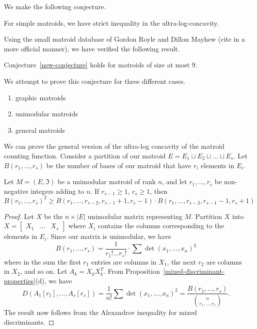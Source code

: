 \documentclass[12pt]{article}
\begin{document}
We make the following conjecture. 

\begin{conj} \label{new-conjecture}
	For simple matroids, we have strict inequality in the ultra-log-concavity. 
\end{conj}

Using the small matroid database of Gordon Royle and Dillon Mayhew (cite in a more official manner), we have verified the following result. 

\begin{thm}
	Conjecture~\ref{new-conjecture} holds for matroids of size at most $9$. 
\end{thm}

We attempt to prove this conjecture for three different cases. 
\begin{enumerate}[label = (\roman*)]
	\item graphic matroids
	\item unimodular matroids
	\item general matroids 
\end{enumerate}

We can prove the general version of the ultra-log concavity of the matroid counting function. Consider a partition of our matroid $E = E_1 \sqcup E_2 \sqcup \ldots \sqcup E_s$. Let $B(r_1, \ldots, r_s)$ be the number of bases of our matroid that have $r_i$ elements in $E_i$. 

\begin{thm}
	Let $M = (E, \mathfrak{I})$ be a unimodular matroid of rank $n$, and let $r_1, \ldots, r_s$ be non-negative integers adding to $n$. If $r_{s-1} \geq 1$, $r_s \geq 1$, then 
	\[
		B(r_1, \ldots, r_s)^2 \geq B(r_1, \ldots, r_{s-2}, r_{s-1} + 1, r_s - 1) \cdot B(r_1, \ldots, r_{s-2}, r_{s-1} - 1, r_{s} + 1)
	\]
\end{thm}

\begin{proof}
	Let $X$ be the $n \times |E|$ unimodular matrix representing $M$. Partition $X$ into $X = \begin{bmatrix} X_1 & \ldots & X_s \end{bmatrix}$ where $X_i$ contains the columns corresponding to the elements in $E_i$. Since our matrix is unimodular, we have 
	\[
		B(r_1, \ldots, r_s) = \frac{1}{r_1! \ldots r_s!} \cdot \sum \det (x_1, \ldots, x_n)^2
	\]
	where in the sum the first $r_1$ entries are columns in $X_1$, the next $r_2$ are columns in $X_2$, and so on. Let $A_k = X_k X_k^T$. From Proposition~\ref{mixed-discriminant-properties}(d), we have 
	\[
		D(A_1 [r_1], \ldots, A_s [r_s]) = \frac{1}{n!} \sum \det (x_1, \ldots, x_n)^2 = \frac{B(r_1, \ldots, r_s)}{\binom{n}{r_1, \ldots, r_s}}. 
	\] 
	The result now follows from the Alexandrov inequality for mixed discriminants. 
\end{proof}
\end{document}
